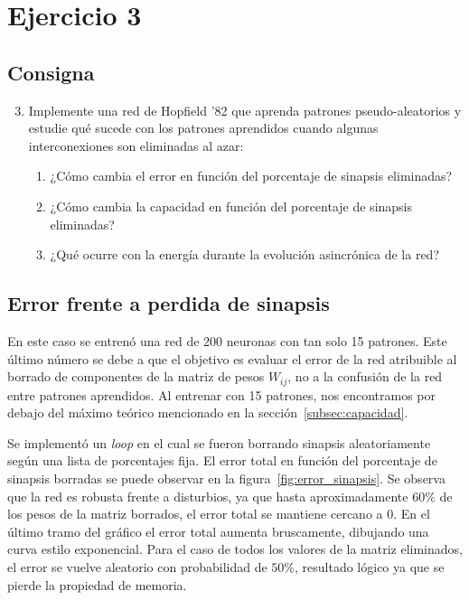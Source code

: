 \section{Ejercicio 3}
\label{sec:ej3}


\subsection{Consigna}

\begin{enumerate}
	\setcounter{enumi}{2} %
	\item Implemente una red de Hopfield '82 que aprenda patrones pseudo-aleatorios y estudie qué sucede con los patrones aprendidos cuando algunas interconexiones son eliminadas al azar:
	\begin{enumerate}
		\item ¿Cómo cambia el error en función del porcentaje de sinapsis eliminadas?
		\item ¿Cómo cambia la capacidad en función del porcentaje de sinapsis eliminadas?
		\item ¿Qué ocurre con la energía durante la evolución asincrónica de la red?
	\end{enumerate}
\end{enumerate}



\subsection{Error frente a perdida de sinapsis}

En este caso se entrenó una red de 200 neuronas con tan solo 15 patrones. Este último número se debe a que el objetivo es evaluar el error de la red atribuible al borrado de componentes de la matriz de pesos $W_{ij}$, no a la confusión de la red entre patrones aprendidos. Al entrenar con 15 patrones, nos encontramos por debajo del máximo teórico mencionado en la sección~\ref{subsec:capacidad}. 

Se implementó un \textit{loop} en el cual se fueron borrando sinapsis aleatoriamente según una lista de porcentajes fija. El error total en función del porcentaje de sinapsis borradas se puede observar en la figura~\ref{fig:error_sinapsis}. Se observa que la red es robusta frente a disturbios, ya que hasta aproximadamente $60\%$ de los pesos de la matriz borrados, el error total se mantiene cercano a 0. En el último tramo del gráfico el error total aumenta bruscamente, dibujando una curva estilo exponencial. Para el caso de todos los valores de la matriz eliminados, el error se vuelve aleatorio con probabilidad de $50\%$, resultado lógico ya que se pierde la propiedad de memoria.


